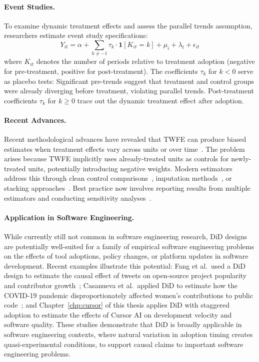 \paragraph{Event Studies.}
To examine dynamic treatment effects and assess the parallel trends assumption, researchers estimate event study specifications:
\begin{equation}
\label{eq:panel-event}
    Y_{it} = \alpha + \sum_{k \neq -1} \tau_k \cdot \mathbf{1}[K_{it} = k] + \mu_i + \lambda_t + \epsilon_{it}
\end{equation}
where $K_{it}$ denotes the number of periods relative to treatment adoption (negative for pre-treatment, positive for post-treatment).
The coefficients $\tau_k$ for $k < 0$ serve as placebo tests: Significant pre-trends suggest that treatment and control groups were already diverging before treatment, violating parallel trends.
Post-treatment coefficients $\tau_k$ for $k \geq 0$ trace out the dynamic treatment effect after adoption.

\paragraph{Recent Advances.}
Recent methodological advances have revealed that TWFE can produce biased estimates when treatment effects vary across units or over time~\cite{goodman2021difference, de2020two}.
The problem arises because TWFE implicitly uses already-treated units as controls for newly-treated units, potentially introducing negative weights.
Modern estimators address this through clean control comparisons~\cite{callaway2021difference}, imputation methods~\cite{borusyak2024revisiting}, or stacking approaches~\cite{baker2022much}.
Best practice now involves reporting results from multiple estimators and conducting sensitivity analyses~\cite{roth2023s}.

\paragraph{Application in Software Engineering.}
While currently still not common in software engineering research, DiD designs are potentially well-suited for a family of empirical software engineering problems on the effects of tool adoptions, policy changes, or platform updates in software development.
Recent examples illustrate this potential: Fang et al.\ used a DiD design to estimate the causal effect of tweets on open-source project popularity and contributor growth~\cite{DBLP:conf/icse/FangLHV22}; Casanueva et al.\ applied DiD to estimate how the COVID-19 pandemic disproportionately affected women's contributions to public code~\cite{casanueva2025impact}; and Chapter~\ref{chp:cursor} of this thesis applies DiD with staggered adoption to estimate the effects of Cursor AI on development velocity and software quality.
These studies demonstrate that DiD is broadly applicable in software engineering contexts, where natural variation in adoption timing creates quasi-experimental conditions, to support causal claims to important software engineering problems.

